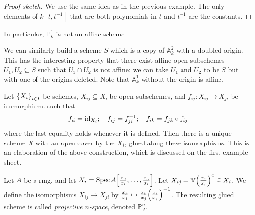\begin{proof}[Proof sketch]
    We use the same idea as in the previous example.
    The only elements of \( k[t, t^{-1}] \) that are both polynomials in \( t \) and \( t^{-1} \) are the constants.
\end{proof}
In particular, \( \mathbb P^1_k \) is not an affine scheme.
\begin{example}
    We can similarly build a scheme \( S \) which is a copy of \( \mathbb A^2_k \) with a doubled origin.
    This has the interesting property that there exist affine open subschemes \( U_1, U_2 \subseteq S \) such that \( U_1 \cap U_2 \) is not affine; we can take \( U_1 \) and \( U_2 \) to be \( S \) but with one of the origins deleted.
    Note that \( \mathbb A^1_k \) without the origin is affine.
\end{example}

Let \( \qty{X_i}_{i \in I} \) be schemes, \( X_{ij} \subseteq X_i \) be open subschemes, and \( f_{ij} : X_{ij} \to X_{ji} \) be isomorphisms such that
\[ f_{ii} = \operatorname{id}_{X_i};\quad f_{ij} = f_{ji}^{-1};\quad f_{ik} = f_{jk} \circ f_{ij} \]
where the last equality holds whenever it is defined.
Then there is a unique scheme \( X \) with an open cover by the \( X_i \), glued along these isomorphisms.
This is an elaboration of the above construction, which is discussed on the first example sheet.

Let \( A \) be a ring, and let \( X_i = \operatorname{Spec} A\qty[\frac{x_0}{x_i}, \dots, \frac{x_n}{x_i}] \).
Let \( X_{ij} = \mathbb V\qty(\frac{x_j}{x_i})^c \subseteq X_i \).
We define the isomorphisms \( X_{ij} \to X_{ji} \) by \( \frac{x_k}{x_i} \mapsto \frac{x_k}{x_j} \qty(\frac{x_i}{x_j})^{-1} \).
The resulting glued scheme is called \emph{projective \( n \)-space}, denoted \( \mathbb P^n_A \).

